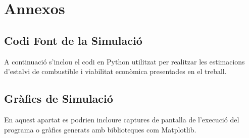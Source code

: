 \chapter{Annexos}

\section{Codi Font de la Simulació}
A continuació s'inclou el codi en Python utilitzat per realitzar les estimacions d'estalvi de combustible i viabilitat econòmica presentades en el treball.



\section{Gràfics de Simulació}
En aquest apartat es podrien incloure captures de pantalla de l'execució del programa o gràfics generats amb biblioteques com Matplotlib.
